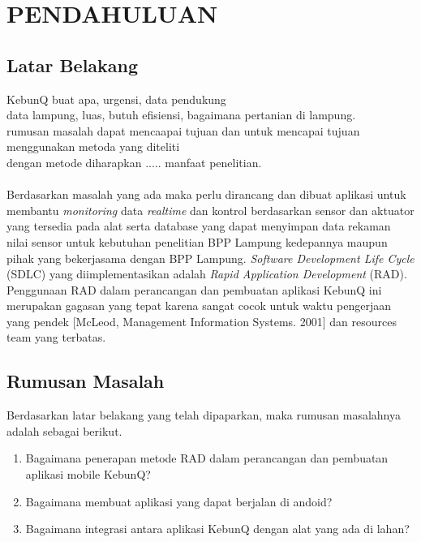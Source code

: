 \chapter{PENDAHULUAN}

\vspace{4.5pt}

\begin{flushleft}
    \section{Latar Belakang} 

\begin{justify}
  \noindent KebunQ buat apa, urgensi, data pendukung\\
  data lampung, luas, butuh efisiensi, bagaimana pertanian di lampung.\\
  rumusan masalah dapat mencaapai tujuan dan untuk mencapai tujuan menggunakan metoda yang diteliti\\
  dengan metode diharapkan ..... manfaat penelitian.
  \\
  \\
  Berdasarkan masalah yang ada maka perlu dirancang dan dibuat aplikasi untuk membantu
\textit{monitoring} data \textit{realtime} dan kontrol berdasarkan sensor dan aktuator yang tersedia pada alat serta database yang dapat menyimpan data rekaman nilai sensor untuk kebutuhan
penelitian BPP Lampung kedepannya maupun pihak yang bekerjasama dengan BPP Lampung. \textit{Software Development Life Cycle} (SDLC) yang diimplementasikan adalah
\textit{Rapid Application Development} (RAD). Penggunaan RAD dalam perancangan dan pembuatan aplikasi KebunQ ini merupakan gagasan yang tepat karena sangat cocok untuk 
waktu pengerjaan yang pendek [McLeod, Management Information Systems. 2001] dan resources team yang terbatas.

\end{justify}
\vspace{1cm}   

\section{Rumusan Masalah}
\begin{justify}
  Berdasarkan latar belakang yang telah dipaparkan, maka rumusan masalahnya adalah sebagai berikut.
\end{justify}
\begin{enumerate}
  \item Bagaimana penerapan metode RAD dalam perancangan dan pembuatan aplikasi mobile KebunQ?
  \item Bagaimana membuat aplikasi yang dapat berjalan di andoid?
  \item Bagaimana integrasi antara aplikasi KebunQ dengan alat yang ada di lahan?
  

\end{enumerate}
\end{flushleft}
